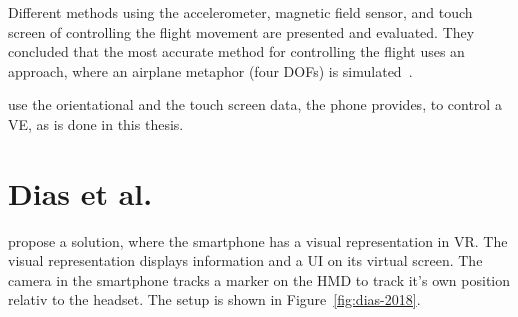 Different methods using the accelerometer, magnetic field sensor, and touch screen of controlling the flight movement are presented and evaluated. They concluded that the most accurate method for controlling the flight uses an approach, where an airplane metaphor (four \glspl{DOF}) is simulated~\cite{Benzina.2011}.

\citeauthor{Benzina.2011} use the orientational and the touch screen data, the phone provides, to control a \gls{VE}, as is done in this thesis.


\section{Dias et al.}\label{section:dias-2018}
\citeauthor{Dias.2018} propose a solution, where the smartphone has a visual representation in \gls{VR}. The visual representation displays information and a \gls{UI} on its virtual screen. The camera in the smartphone tracks a marker on the \gls{HMD} to track it's own position relativ to the headset. The setup is shown in Figure~\ref{fig:dias-2018}.

